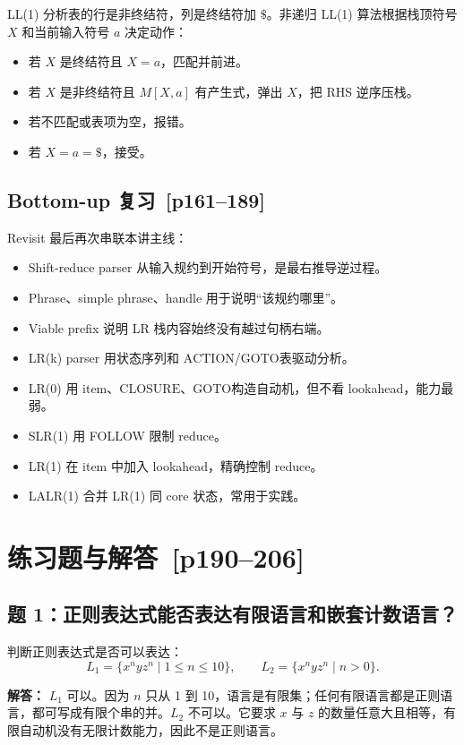 \documentclass[UTF8,fontset=none,11pt]{ctexart}
\newcommand{\pg}[1]{\texorpdfstring{{\small\color{graytext}\,[p#1]}}{ [p#1]}}
\newcommand{\ACTION}{\ensuremath{\mathrm{ACTION}}}
\newcommand{\GOTO}{\ensuremath{\mathrm{GOTO}}}
\newcommand{\CLOSURE}{\ensuremath{\mathrm{CLOSURE}}}
\begin{document}
LL(1) 分析表的行是非终结符，列是终结符加 \(\$\)。非递归 LL(1) 算法根据栈顶符号 \(X\) 和当前输入符号 \(a\) 决定动作：

\begin{itemize}
  \item 若 \(X\) 是终结符且 \(X=a\)，匹配并前进。
  \item 若 \(X\) 是非终结符且 \(M[X,a]\) 有产生式，弹出 \(X\)，把 RHS 逆序压栈。
  \item 若不匹配或表项为空，报错。
  \item 若 \(X=a=\$\)，接受。
\end{itemize}

\subsection{Bottom-up 复习 \pg{161--189}}

Revisit 最后再次串联本讲主线：

\begin{itemize}
  \item Shift-reduce parser 从输入规约到开始符号，是最右推导逆过程。
  \item Phrase、simple phrase、handle 用于说明“该规约哪里”。
  \item Viable prefix 说明 LR 栈内容始终没有越过句柄右端。
  \item LR(k) parser 用状态序列和 \ACTION/\GOTO 表驱动分析。
  \item LR(0) 用 item、\CLOSURE、\GOTO 构造自动机，但不看 lookahead，能力最弱。
  \item SLR(1) 用 FOLLOW 限制 reduce。
  \item LR(1) 在 item 中加入 lookahead，精确控制 reduce。
  \item LALR(1) 合并 LR(1) 同 core 状态，常用于实践。
\end{itemize}

\section{练习题与解答 \pg{190--206}}

\subsection*{题 1：正则表达式能否表达有限语言和嵌套计数语言？}

判断正则表达式是否可以表达：
\[
L_1=\{x^n y z^n\mid 1\le n\le 10\},\qquad
L_2=\{x^n y z^n\mid n>0\}.
\]

\textbf{解答：} \(L_1\) 可以。因为 \(n\) 只从 1 到 10，语言是有限集；任何有限语言都是正则语言，都可写成有限个串的并。\(L_2\) 不可以。它要求 \(x\) 与 \(z\) 的数量任意大且相等，有限自动机没有无限计数能力，因此不是正则语言。
\end{document}
